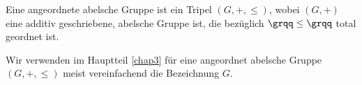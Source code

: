 
%
\begin{defn} %
Eine angeordnete abelsche Gruppe ist ein Tripel $\left(G, +, \leq\right)$, wobei $\left(G, +\right)$ eine additiv geschriebene, abelsche Gruppe ist, die bezüglich $\grqq\leq\grqq$ total geordnet ist.
\end{defn}
%
%
%
%
\begin{nota}
Wir verwenden im Hauptteil \ref{chap3} für eine angeordnet abelsche Gruppe $\left(G, +, \leq\right)$ meist vereinfachend die Bezeichnung $G$.
\end{nota}

